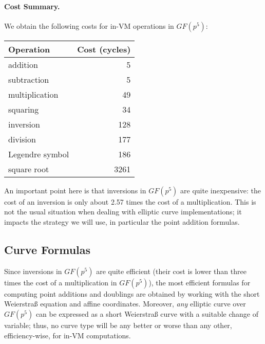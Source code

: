 \documentclass{llncs}
\newcommand{\GF}{GF}
\begin{document}
\paragraph{Cost Summary.} We obtain the following costs for in-VM
operations in $\GF(p^5)$:
\begin{center}
    \begin{tabular}{|l|r|}
        \hline
        \textsf{\textbf{Operation}} & \textsf{\textbf{Cost (cycles)}} \\
        \hline
        addition         &    5 \\
        subtraction      &    5 \\
        multiplication   &   49 \\
        squaring         &   34 \\
        inversion        &  128 \\
        division         &  177 \\
        Legendre symbol  &  186 \\
        square root      & 3261 \\
        \hline
    \end{tabular}
\end{center}
An important point here is that inversions in $\GF(p^5)$ are quite
inexpensive: the cost of an inversion is only about 2.57 times the
cost of a multiplication. This is not the usual situation when
dealing with elliptic curve implementations; it impacts the strategy
we will use, in particular the point addition formulas.

\subsection{Curve Formulas}\label{sec:invm-curve-formulas}

Since inversions in $\GF(p^5)$ are quite efficient (their cost is lower
than three times the cost of a multiplication in $\GF(p^5)$), the most
efficient formulas for computing point additions and doublings are
obtained by working with the short Weierstraß equation and affine
coordinates. Moreover, \emph{any} elliptic curve over $\GF(p^5)$ can be
expressed as a short Weierstraß curve with a suitable change of
variable; thus, no curve type will be any better or worse than any
other, efficiency-wise, for in-VM computations.
\end{document}
